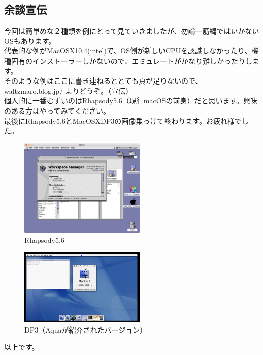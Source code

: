 \documentclass[b5paper,9pt,platex,dvipdfmx]{jsarticle}
\begin{document}
\begin{multicols*}{3}
\section{余談宣伝}
今回は簡単めな２種類を例にとって見ていきましたが、勿論一筋縄ではいかないOSもあります。\\
代表的な例がMacOSX10.4(intel)で、OS側が新しいCPUを認識しなかったり、機種固有のインストーラーしかないので、エミュレートがかなり難しかったりします。\\
そのような例はここに書き連ねるととても頁が足りないので、waltzmaro.blog.jp/ よりどうぞ。（宣伝）\\
個人的に一番むずいのはRhapsody5.6（現行macOSの前身）だと思います。興味のある方はやってみてください。\\
最後にRhapsody5.6とMacOSXDP3の画像乗っけて終わります。お疲れ様でした。\\
\begin{figure}[H]
  \centering
  \includegraphics[width=6cm]{osx-rhapsody.png}
  \caption{Rhapsody5.6}
\end{figure}
\begin{figure}[H]
  \centering
  \includegraphics[width=6cm]{osx-dp3.png}
  \caption{DP3（Aquaが紹介されたバージョン）}
\end{figure}
以上です。\\




\end{multicols*}
\end{document}
